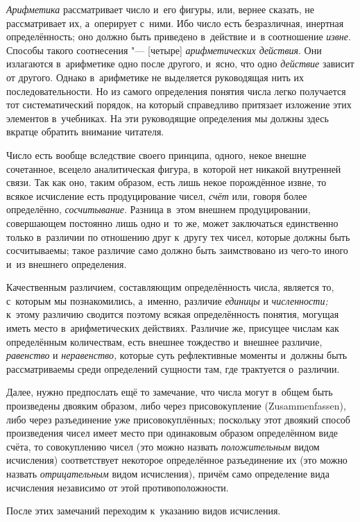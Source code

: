 {\em Арифметика} рассматривает число и~его фигуры, или, вернее сказать, не
рассматривает их, а~оперирует с~ними. Ибо число есть безразличная, инертная
определённость; оно должно быть приведено в~действие и~в соотношение
{\em извне}. Способы такого соотнесения "--- [четыре] {\em арифметических действия}.
Они излагаются в~арифметике одно после другого, и~ясно, что одно {\em действие}
зависит от другого. Однако в~арифметике не выделяется руководящая нить их
последовательности. Но из самого определения понятия числа легко получается тот
систематический порядок, на который справедливо притязает изложение этих
элементов в~учебниках. На эти руководящие определения мы должны здесь вкратце
обратить внимание читателя.

Число есть вообще вследствие своего принципа, одного, некое внешне сочетанное,
всецело аналитическая фигура, в~которой нет никакой внутренней связи. Так как
оно, таким образом, есть лишь некое порождённое извне, то всякое исчисление
есть продуцирование чисел, {\em счёт} или, говоря более определённо,
{\em сосчитывание}. Разница в~этом внешнем продуцировании, совершающем
постоянно лишь одно и~то же, может заключаться единственно только в~различии по
отношению друг к~другу тех чисел, которые должны быть сосчитываемы; такое
различие само должно быть заимствовано из чего-то иного и~из внешнего
определения.

Качественным различием, составляющим определённость числа, является то,
с~которым мы познакомились, а~именно, различие {\em единицы} и {\em численности;}
к~этому различию сводится поэтому всякая определённость понятия, могущая иметь
место в~арифметических действиях. Различие же, присущее числам как определённым
количествам, есть внешнее тождество и~внешнее различие, {\em равенство} и
{\em неравенство,} которые суть рефлективные моменты и~должны быть
рассматриваемы среди определений сущности там, где трактуется о~различии.

Далее, нужно предпослать ещё то замечание, что числа могут в~общем быть
произведены двояким образом, либо через присовокупление
(Zu\-sam\-men\-fas\-sen), либо через разъединение уже присовокуплённых;
поскольку этот двоякий способ произведения чисел имеет место при одинаковым
образом определённом виде счёта, то совокуплению чисел (это можно назвать
{\em положительным} видом исчисления) соответствует некоторое определённое
разъединение их (это можно назвать {\em отрицательным} видом исчисления),
причём само определение вида исчисления независимо от этой противоположности.

После этих замечаний переходим к~указанию видов исчисления.

